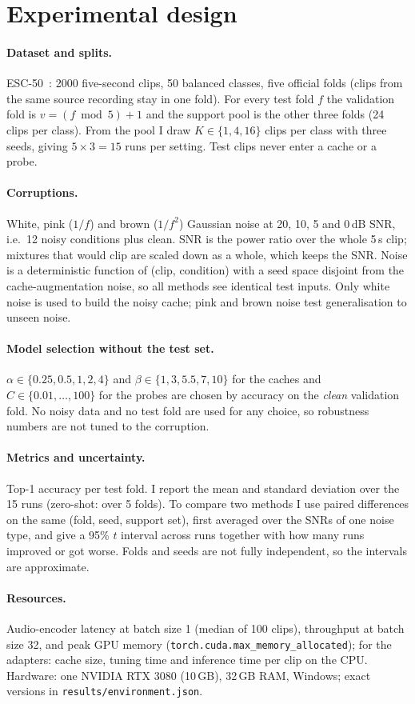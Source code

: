 \section{Experimental design}
\label{sec:design}

\paragraph{Dataset and splits.}
ESC-50~\cite{piczak2015esc}: 2000 five-second clips, 50 balanced classes, five official folds (clips from the same source recording stay in one fold).
For every test fold $f$ the validation fold is $v=(f \bmod 5)+1$ and the support pool is the other three folds (24 clips per class).
From the pool I draw $K\in\{1,4,16\}$ clips per class with three seeds, giving $5\times3=15$ runs per setting. Test clips never enter a cache or a probe.

\paragraph{Corruptions.}
White, pink ($1/f$) and brown ($1/f^2$) Gaussian noise at 20, 10, 5 and 0\,dB SNR, i.e.\ 12 noisy conditions plus clean.
SNR is the power ratio over the whole 5\,s clip; mixtures that would clip are scaled down as a whole, which keeps the SNR.
Noise is a deterministic function of (clip, condition) with a seed space disjoint from the cache-augmentation noise, so all methods see identical test inputs.
Only white noise is used to build the noisy cache; pink and brown noise test generalisation to unseen noise.

\paragraph{Model selection without the test set.}
$\alpha\in\{0.25,0.5,1,2,4\}$ and $\beta\in\{1,3,5.5,7,10\}$ for the caches and $C\in\{0.01,\dots,100\}$ for the probes are chosen by accuracy on the \emph{clean}
validation fold. No noisy data and no test fold are used for any choice, so robustness numbers are not tuned to the corruption.

\paragraph{Metrics and uncertainty.}
Top-1 accuracy per test fold. I report the mean and standard deviation over the 15 runs (zero-shot: over 5 folds).
To compare two methods I use paired differences on the same (fold, seed, support set), first averaged over the SNRs of one noise type,
and give a 95\% $t$ interval across runs together with how many runs improved or got worse. Folds and seeds are not fully independent, so the intervals are approximate.

\paragraph{Resources.}
Audio-encoder latency at batch size 1 (median of 100 clips), throughput at batch size 32, and peak GPU memory (\texttt{torch.cuda.max\_memory\_allocated});
for the adapters: cache size, tuning time and inference time per clip on the CPU.
Hardware: one NVIDIA RTX 3080 (10\,GB), 32\,GB RAM, Windows; exact versions in \texttt{results/environment.json}.
